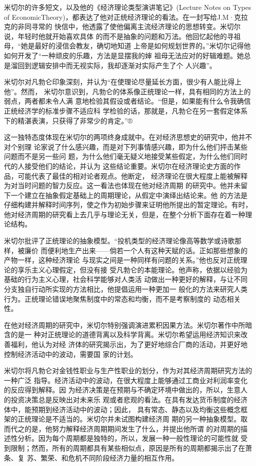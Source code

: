 米切尔的许多短文，以及他的《经济理论类型演讲笔记》(Lecture Notes on Types of
EconomicTheory)，都表达了他对正统经济理论的看法。在一封写给J.M·克拉克的非同寻常的
快信中，他透露了使他偏离主流经济理论的思想转变。米切尔说，年轻时他就开始喜欢具体
的而不是抽象的问题和万法。他回忆起他的寻祖母，“她是最好的浸信会教友，确切地知道
上帝是如何规划世界的。”米切尔记得他如何开发了“一种顽皮的乐趣，方法是显摆我的婶
祖母无法应对的好辑难题。她总是溜回到逻辑安排中而无视实际，我却逐渐对实际产生了个
人兴趣”。

米切尔对凡勃仑印象深刻，并认为“在使理论尽量延长方面，很少有人能比得上他”。然而，
米切尔意识到，凡勃仑的体系像正统理论一样，具有相同的方法上的弱点，两者都未令人满
意地检验其假设或者结论。“但是，如果能有什么令我确信正统经济学的标准步骤不适应科
学检验的话，那就是，凡勃仑在另一套假定体系下的精湛表演，只获得了非常少的肯定。”®

这一独特态度体现在米切尔的两项终身成就中。在对经济思想史的研究中，他并不对个别理
论家说了什么感兴趣，而是对下列事情感兴趣，即为什么他们抨击某些问题而不是另一些问
题，为什么他们毫无疑义地接受某些假定，为什么他们同时代的人接受他们的结论，并认为
这些结论重要。米切尔在经济理论史方面的作品，可能代表了最佳的相对论者观点。他断定，
经济理论在很大程度上能被解释为对当时问题的智力反应。这一看法也体现在他对经济周期
的研究中。他并未留下一个建立在抽象假定基础上的周期理论，从假定中演绎出结论来。他
的方法是仔细构建并解释时间序列，使之作为初始步骤来证明他所提出的暂定理论。有时，
他对经济周期的研究看上去几乎与理论无关，但是，在整个分析下面存在着一种理论结构。

米切尔批评了正统理论的抽象模型。“投机类型的经济理论像高等数学或诗歌那样，被廉价
而便利地生产出来——倘若一个人有这种天赋的话。正如那些想象的产物一样，这种经济理论
与现实之间是一种同样有问题的关系。”他也反对正统理论的享乐主义心理假定，但没有接
受凡勃仑的本能理论。他声称，依据以经验为基础的行为主义心理，社会科学能够对人类活
动做出一种更好的解释，与让不同分支独自行动所实现的方法相比，他提倡运用一种更加一
般化的方法来研究人类行为。正统理论错误地聚焦制度中的常态和均衡，而不是考察制度的
动态相关性。

在他对经济周期的研究中，米切尔特别强调演进累积因果方法。米切尔著作中所暗含的是一
种对正统理论的道德背离以及科学背离。米切尔希望运用经济知识来改善福利，他认为对经
济体的研究揭示出，为了更好地综合厂商的活动，并更好地控制经济活动中的波动，需要国
家的计划。

米切尔将凡勃仑对金钱性职业与生产性职业的划分，作为对其经济周期研究方法的一种广泛
指导。经济活动中的波动，在很大程度上能够通过工商业对利润率变化的反应得到解释。因
为经济决策是在预期与不确定环境中做出的，所以，生意人的投资决策总是反映出对未来乐
观或者悲观的看法。在具有发达货币制度的经济体中，能预期到经济活动中的波动；因此，
具有常态、静态以及均衡这些概念框架的正统理论是不适当的。米切尔并未试图构建经济周
期的另一种抽象模型。取而代之的是，他努力解释经济周期期间发生了什么，并提出他所谓
的对周期的描述性分析。因为每个周期都是独特的，所以，发展一种一般性理论的可能性就
受到限制；然而，所有的周期都具有某些相似点，原因是所有的周期都揭示出了在萧条、复
苏、繁荣、和危机不同阶段经济力量的相互作用。

